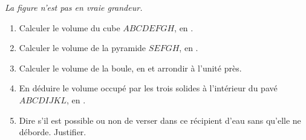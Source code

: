 \begin{exercice*}
\begin{center}
        \textit{La figure n’est pas en vraie grandeur.}
    \end{center}
    \begin{enumerate}
        \item Calculer le volume du cube $ABCDEFGH$, en \Vol[cm]{}.
        \item Calculer le volume de la pyramide $SEFGH$, en \Vol[cm]{}.
        \item Calculer le volume de la boule, en \Vol[cm]{} et arrondir à l’unité près.
        \item En déduire le volume occupé par les trois  solides à l’intérieur du pavé $ABCDIJKL$, en \Vol[cm]{}.
        \item Dire s'il est possible ou non de verser dans ce récipient  d’eau sans qu’elle ne déborde. Justifier.
    \end{enumerate}
\end{exercice*}
